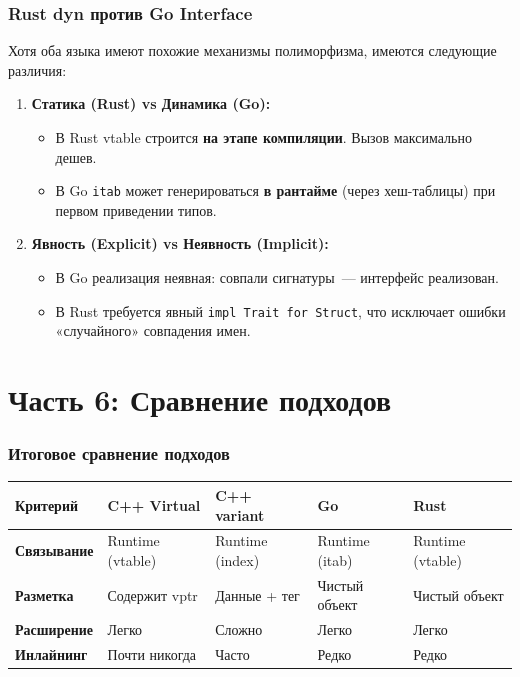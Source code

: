 \documentclass[10pt, aspectratio=169]{beamer}
\begin{document}
\begin{frame}
\frametitle{Rust dyn против Go Interface}
Хотя оба языка имеют похожие механизмы полиморфизма, имеются следующие различия:
\vspace{0.3cm}
\begin{enumerate}
    \item \textbf{Статика (Rust) vs Динамика (Go):}
    \begin{itemize}
        \item В Rust vtable строится \textbf{на этапе компиляции}. Вызов максимально дешев.
        \item В Go \texttt{itab} может генерироваться \textbf{в рантайме} (через хеш-таблицы) при первом приведении типов.
    \end{itemize}
    \item \textbf{Явность (Explicit) vs Неявность (Implicit):}
    \begin{itemize}
        \item В Go реализация неявная: совпали сигнатуры~--- интерфейс реализован.
        \item В Rust требуется явный \texttt{impl Trait for Struct}, что исключает ошибки «случайного» совпадения имен.
    \end{itemize}
\end{enumerate}
\end{frame}

\section{Часть 6: Сравнение подходов}

\begin{frame}
\frametitle{Итоговое сравнение подходов}
\small
\begin{table}
\centering
\begin{tabular}{|l|l|l|l|l|}
\hline
\textbf{Критерий} & \textbf{C++ Virtual} & \textbf{C++ variant} & \textbf{Go} & \textbf{Rust} \\ \hline
\textbf{Связывание} & Runtime (vtable) & Runtime (index) & Runtime (itab) & Runtime (vtable) \\ \hline
\textbf{Разметка} & Содержит vptr & Данные + тег & Чистый объект & Чистый объект \\ \hline
\textbf{Расширение} & Легко & Сложно & Легко & Легко \\ \hline
\textbf{Инлайнинг} & Почти никогда & Часто & Редко & Редко \\ \hline
\end{tabular}
\end{table}
\end{frame}
\end{document}
